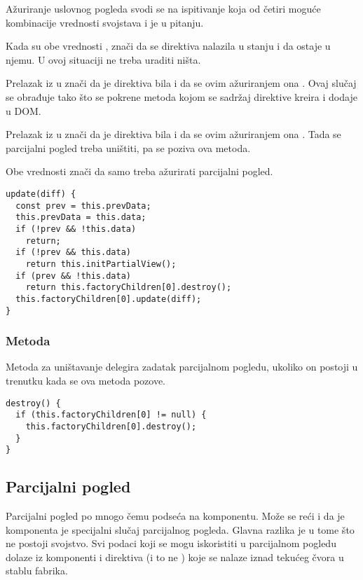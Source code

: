 Ažuriranje uslovnog pogleda svodi se na ispitivanje koja od četiri moguće kombinacije vrednosti svojstava  i  je u pitanju.

Kada su obe vrednosti , znači da se direktiva nalazila u  stanju i da ostaje u njemu.
U ovoj situaciji ne treba uraditi ništa.

Prelazak iz  u  znači da je direktiva bila  i da se ovim ažuriranjem ona .
Ovaj slučaj se obrađuje tako što se pokrene metoda  kojom se sadržaj direktive kreira i dodaje u DOM.

Prelazak iz  u  znači da je direktiva bila  i da se ovim ažuriranjem ona .
Tada se parcijalni pogled treba uništiti, pa se poziva ova metoda.

Obe vrednosti  znači da samo treba ažurirati parcijalni pogled.

\begin{lstlisting}
update(diff) {
  const prev = this.prevData;
  this.prevData = this.data;
  if (!prev && !this.data)
    return;
  if (!prev && this.data)
    return this.initPartialView();
  if (prev && !this.data)
    return this.factoryChildren[0].destroy();
  this.factoryChildren[0].update(diff);
}
\end{lstlisting}

\subsubsection{Metoda }

Metoda za uništavanje delegira zadatak parcijalnom pogledu, ukoliko on postoji u trenutku kada se ova metoda pozove.

\begin{lstlisting}
destroy() {
  if (this.factoryChildren[0] != null) {
    this.factoryChildren[0].destroy();
  }
}
\end{lstlisting}

\subsection{Parcijalni pogled}

Parcijalni pogled po mnogo čemu podseća na komponentu.
Može se reći i da je komponenta je specijalni slučaj parcijalnog pogleda.
Glavna razlika je u tome što ne postoji  svojstvo.
Svi podaci koji se mogu iskoristiti u parcijalnom pogledu dolaze iz komponenti i direktiva (i to ne ) koje se nalaze iznad tekućeg čvora u stablu fabrika.

